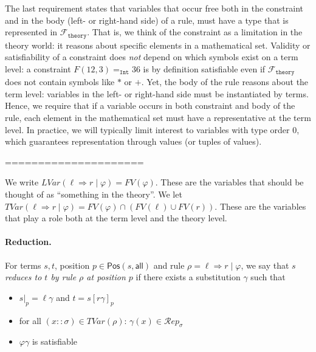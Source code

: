 \documentclass{lmcs}
\theoremstyle{theorem}\newtheorem{theorem}{Theorem}
\theoremstyle{theorem}\newtheorem{lemma}[theorem]{Lemma}
\theoremstyle{theorem}\newtheorem{corollary}[theorem]{Corollary}
\theoremstyle{definition}\newtheorem{definition}[theorem]{Definition}
\theoremstyle{definition}\newtheorem{example}[theorem]{Example}
\newcommand{\thF}{\mathcal{F}_{\mathtt{theory}}}
\newcommand{\FV}{\mathit{FV}}
\newcommand{\Positions}{\mathsf{Pos}}
\newcommand{\Reps}[1]{\mathcal{R}\!\mathit{ep}_{#1}}
\newcommand{\LVar}[1]{\mathit{LVar}(#1)}
\newcommand{\TLVar}[1]{\mathit{TVar}(#1)}
\newcommand{\atype}{\sigma}
\newcommand{\avar}{x}
\newcommand{\arrz}{\Rightarrow}
\newcommand{\symb}[1]{\mathtt{#1}}
\newcommand{\tint}{\symb{Int}}
\newcommand{\myparagraph}[1]{\paragraph{\textbf{#1.}}}
\begin{document}
The last requirement states that variables that occur free both in the
constraint and in the body (left- or right-hand side) of a rule, must have a
type that is represented in $\thF$.  That is, we think of the constraint as a
limitation in the theory world: it reasons about specific elements in a
mathematical set.  Validity or satisfiability of a constraint does \emph{not}
depend on which symbols exist on a term level: a constraint $F(12,3) =_\tint
36$ is by definition satisfiable even if $\thF$ does not contain symbols like
$*$ or $+$.  Yet, the body of the rule reasons about the term level: variables
in the left- or right-hand side must be instantiated by terms.  Hence, we
require that if a variable occurs in both constraint and body of the rule,
each element in the mathematical set must have a representative at the term
level.
In practice, we will typically limit interest to variables with type order $0$,
which guarantees representation through values (or tuples of values).

=====================

We write $\LVar{\ell \arrz r \mid \varphi} = \FV(\varphi)$.  These are the
variables that should be thought of as ``something in the theory''.
We let $\TLVar{\ell \arrz r \mid \varphi} = \FV(\varphi) \cap (\FV(\ell) \cup
\FV(r))$.  These are the variables that play a role both at the term level and
the theory level.

\myparagraph{Reduction}
For terms $s,t$, position $p \in \Positions(s,\mathsf{all})$ and rule $\rho =
\ell \arrz r \mid \varphi$, we say that \emph{$s$ reduces to $t$ by rule $\rho$
at position $p$} if there exists a substitution $\gamma$ such that
\begin{itemize}
\item $s|_p = \ell\gamma$ and $t = s[r\gamma]_p$
\item for all $(\avar :: \atype) \in \TLVar{\rho}$:
  $\gamma(\avar) \in \Reps{\atype}$
\item $\varphi\gamma$ is satisfiable
\end{itemize}
\end{document}
